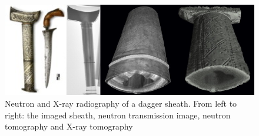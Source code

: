 \begin{figure}[!ht]
	\begin{center}
		\includegraphics[width=\textwidth]{01_Introduction/figures/fig000_Dague}
	\end{center}
	\caption[Neutron and X-ray radiography of a dagger sheath]{Neutron and X-ray radiography of a dagger sheath. From left to right: the imaged sheath, neutron transmission image, neutron tomography and X-ray tomography \cite{LEHMANN2012S35}}
	\label{chap1:fig:Dague}
\end{figure}
